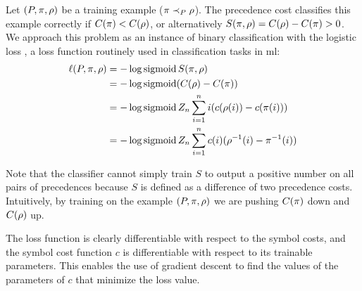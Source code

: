 Let $(P, \pi, \rho)$ be a training example ($\pi \prec_{P} \rho$).
The precedence cost classifies this example correctly if $C(\pi) < C(\rho)$,
or alternatively $S(\pi, \rho) = C(\rho) - C(\pi) > 0$.
We approach this problem as an instance of binary classification with the logistic loss \cite{Mohri2018},
a loss function routinely used in classification tasks in \acrlong{ml}:
\begin{align*}
\ell(P, \pi, \rho)
&= - \log \operatorname{sigmoid} S(\pi, \rho) \\
&= - \log \operatorname{sigmoid} (C(\rho) - C(\pi)) \\
&= - \log \operatorname{sigmoid} Z_n \sum_{i=1}^n i (c(\rho(i)) - c(\pi(i))) \\
&= - \log \operatorname{sigmoid} Z_n \sum_{i=1}^n c(i) (\rho^{-1}(i) - \pi^{-1}(i))
\end{align*}

Note that the classifier cannot simply train $S$ to output a positive number on all pairs of precedences
because $S$ is defined as a difference of two precedence costs.
Intuitively, by training on the example $(P, \pi, \rho)$
we are pushing $C(\pi)$ down and $C(\rho)$ up.

The loss function is clearly differentiable with respect to the symbol costs,
and the symbol cost function $c$ is differentiable with respect to its trainable parameters.
This enables the use of gradient descent to find the values of the parameters of $c$
that minimize the loss value.
